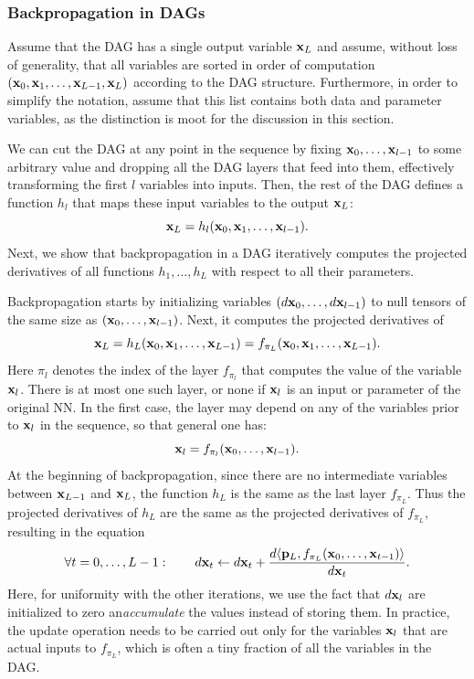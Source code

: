 \subsubsection{Backpropagation in DAGs}\label{s:dag}

Assume that the DAG has a single output variable $\mathbf{x}_L$ and assume, without loss of generality, that all variables are sorted in order of computation $(\mathbf{x}_0,\mathbf{x}_1,\dots,\mathbf{x}_{L-1},\mathbf{x}_L)$ according to the DAG structure. Furthermore, in order to simplify the notation, assume that this list contains both data and parameter variables, as the distinction is moot for the discussion in this section.

We can cut the DAG at any point in the sequence by fixing $\mathbf{x}_0, \dots, \mathbf{x}_{l-1}$ to some arbitrary value and dropping all the DAG layers that feed into them, effectively transforming the first $l$ variables into inputs. Then, the rest of the DAG defines a function $h_l$ that maps these input variables to the output $\mathbf{x}_L$:
\[
\mathbf{x}_L = h_l(\mathbf{x}_0,\mathbf{x}_1,\dots,\mathbf{x}_{l-1}).
\]
Next, we show that backpropagation in a DAG iteratively computes the projected derivatives of all functions $h_1,\dots,h_L$ with respect to all their parameters.

Backpropagation starts by initializing variables $(d\mathbf{x}_{0},\dots,d\mathbf{x}_{l-1})$ to null tensors of the same size as $(\mathbf{x}_0,\dots,\mathbf{x}_{l-1})$. Next, it computes the projected derivatives of
\[
\mathbf{x}_L = h_L(\mathbf{x}_0,\mathbf{x}_1,\dots,\mathbf{x}_{L-1}) =
f_{\pi_L}(\mathbf{x}_0,\mathbf{x}_1,\dots,\mathbf{x}_{L-1}).
\]
Here $\pi_l$ denotes the index of the layer $f_{\pi_l}$ that computes the value of the variable $\mathbf{x}_l$. There is at most one such layer, or none if $\mathbf{x}_l$ is an input or parameter of the original NN. In the first case, the layer may depend on any of the variables prior to $\mathbf{x}_l$ in the sequence, so that general one has:
\[
\mathbf{x}_{l} = f_{\pi_l}(\mathbf{x}_0,\dots,\mathbf{x}_{l-1}).
\]
At the beginning of backpropagation, since there are no intermediate variables between $\mathbf{x}_{L-1}$ and $\mathbf{x}_L$, the function $h_L$ is the same as the last layer $f_{\pi_L}$. Thus the projected derivatives of $h_L$ are the same as the projected derivatives of $f_{\pi_L}$, resulting in the equation
\[
\forall t=0,\dots,L-1:\qquad
d\mathbf{x}_{t} \leftarrow d\mathbf{x}_{t}
+ \frac{d\langle \mathbf{p}_L, f_{\pi_L}(\mathbf{x}_0,\dots,\mathbf{x}_{t-1})\rangle}{d\mathbf{x}_t}.
\]
Here, for uniformity with the other iterations, we use the fact that $d\mathbf{x}_l$ are initialized to zero an\emph{accumulate} the values instead of storing them. In practice, the update operation needs to be carried out only for the variables $\mathbf{x}_l$ that are actual inputs to $f_{\pi_L}$, which is often a tiny fraction of all the variables in the DAG.


